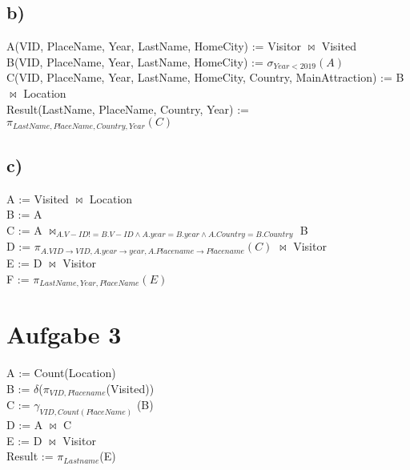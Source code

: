 \documentclass{article}
\begin{document}
	\subsection*{b)}
	A(VID, PlaceName, Year, LastName, HomeCity) := Visitor $\bowtie$ Visited \\
	B(VID, PlaceName, Year, LastName, HomeCity) := $\sigma_{Year<2019}(A)$ \\
	C(VID, PlaceName, Year, LastName, HomeCity, Country, MainAttraction) := B $\bowtie$ Location \\
	Result(LastName, PlaceName, Country, Year) := $\pi_{LastName, PlaceName, Country, Year}(C)$
	\subsection*{c)}
	A := Visited $\bowtie$ Location \\
	B := A \\
	C := A $\bowtie_{A.V-ID != B.V-ID \land A.year = B.year \land A.Country = B.Country }$ B \\
	D := $\pi_{A.VID \to VID, A.year \to year, A.Placename \to Placename}(C)$ $\bowtie$ Visitor \\
	E :=  D $\bowtie$ Visitor \\
	F := $\pi_{LastName, Year, PlaceName}(E)$
	\section*{Aufgabe 3}
	A := Count(Location) \\
	B := $\delta$($\pi_{VID, Placename}$(Visited)) \\
	C := $\gamma_{VID, Count(PlaceName)}$ (B)\\
	D := A $\bowtie$ C \\
	E := D $\bowtie$ Visitor \\
	Result := $\pi_{Lastname}$(E)
	
	
\end{document}
